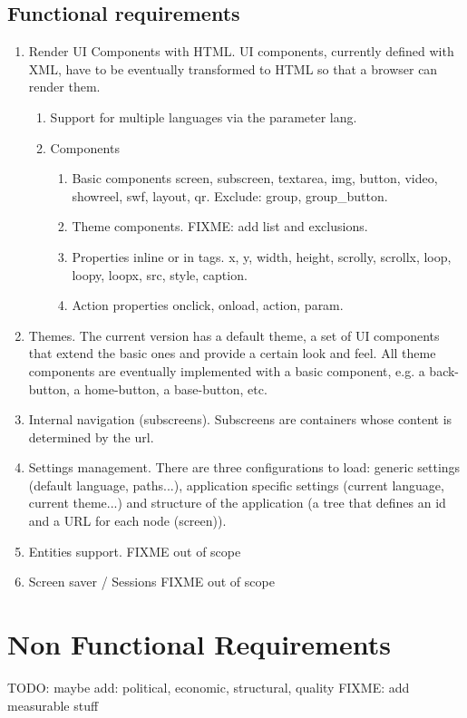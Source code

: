 \subsection{Functional requirements}
\begin{enumerate}
    \item Render \ac{UI} Components with \ac{HTML}. \ac{UI} components, currently defined with \ac{XML}, have to be eventually transformed to \ac{HTML} so that a browser can render them.
    \begin{enumerate}
        \item Support for multiple languages via the parameter lang.
        \item Components 
        \begin{enumerate}
            \item Basic components screen, subscreen, textarea, img, button, video, showreel, swf, layout, qr.  Exclude: group, group\_button.
            \item Theme components. FIXME: add list and exclusions.
            \item Properties inline or in tags. x, y, width, height, scrolly, scrollx, loop, loopy, loopx, src, style, caption.
            \item Action properties onclick, onload, action, param.
        \end{enumerate}
        
    \end{enumerate}
    \item Themes. The current version has a default theme, a set of UI components that extend the basic ones and provide a certain look and feel. All theme components are eventually implemented with a basic component, e.g. a back-button, a home-button, a base-button, etc.
    \item Internal navigation (subscreens). Subscreens are containers whose content is determined by the url.
    \item Settings management. There are three configurations to load: generic settings (default language, paths...), application specific settings (current language, current theme...) and structure of the application (a tree that defines an id and a \ac{URL} for each node (screen)).
    \item Entities support. FIXME out of scope
    \item Screen saver / Sessions FIXME out of scope
\end{enumerate}

\section{Non Functional Requirements}
TODO: maybe add: political, economic, structural, quality
FIXME: add measurable stuff


